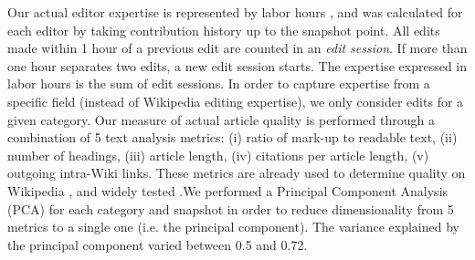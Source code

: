 Our actual editor expertise is represented by labor hours \cite{geiger2013}, and was calculated for each editor by taking contribution history up to the snapshot point. All edits made within 1 hour of a previous edit are counted in an {\it edit session}. If more than one hour separates two edits, a new edit session starts. The expertise expressed in labor hours is the sum of edit sessions. In order to capture expertise from a specific field (instead of Wikipedia editing expertise), we only consider edits for a given category. Our measure of actual article quality is performed through a combination of 5 text analysis metrics: (i) ratio of mark-up to readable text, (ii) number of headings, (iii) article length, (iv) citations per article length, (v) outgoing intra-Wiki links. These metrics are already used to determine quality on Wikipedia \cite{wang2013tell}, and widely tested \cite{klein}.We performed a Principal Component Analysis (PCA) for each category and snapshot in order to reduce dimensionality from 5 metrics to a single one (i.e. the principal component). The variance explained by the principal component varied between 0.5 and 0.72.

